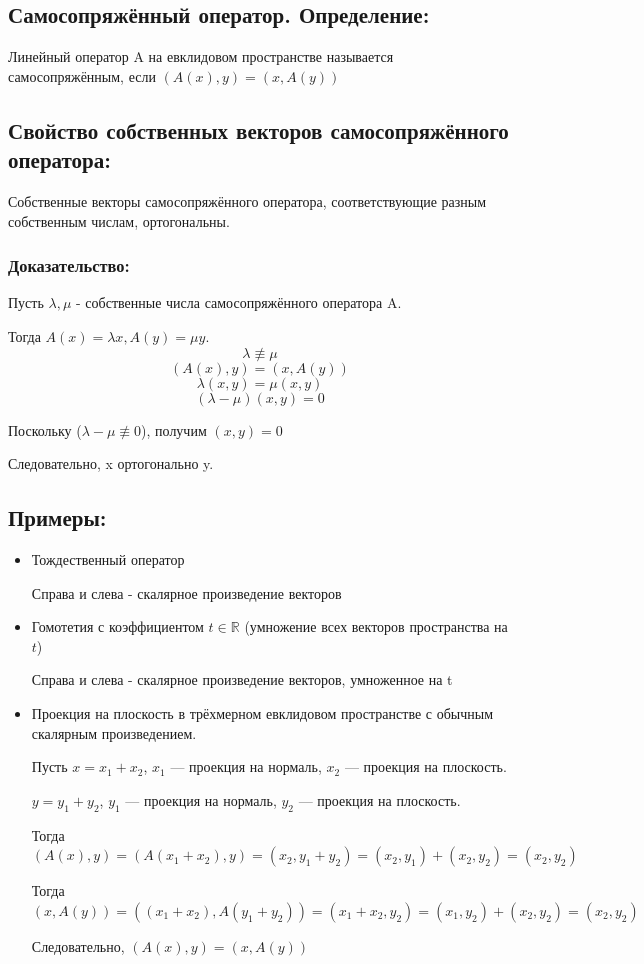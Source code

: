 \documentclass[12pt]{article}
\begin{document}
\subsection{Самосопряжённый оператор. Определение:}
Линейный оператор A на евклидовом пространстве называется самосопряжённым, если $(A(x), y) = (x, A(y))$

\subsection{Свойство собственных векторов самосопряжённого оператора:}
Собственные векторы самосопряжённого оператора, соответствующие разным собственным числам, ортогональны.

\subsubsection{Доказательство:}

Пусть $\lambda, \mu$ - собственные числа самосопряжённого оператора A.

Тогда $A(x) = \lambda x, A(y) = \mu y$.
\[
    \lambda \not \equiv \mu
\]
\[
    (A(x), y) = (x, A(y))
\]
\[
    \lambda (x, y) = \mu (x, y)
\]
\[
    (\lambda - \mu)(x, y) = 0
\]

Поскольку ($\lambda - \mu \not\equiv 0$), получим $(x, y) = 0$

Следовательно, x ортогонально y.

\subsection{Примеры:}
\begin{itemize}
    \item Тождественный оператор

          \quad Справа и слева - скалярное произведение векторов
    \item Гомотетия с коэффициентом $t \in \mathbb{R}$ (умножение всех векторов пространства на $t$)

          \quad Справа и слева - скалярное произведение векторов, умноженное на t
    \item Проекция на плоскость в трёхмерном евклидовом пространстве с обычным скалярным произведением.

          \quad Пусть $x = x_1 + x_2$, $x_1$ --- проекция на нормаль, $x_2$ --- проекция на плоскость.

          \quad $y = y_1 + y_2$, $y_1$ --- проекция на нормаль, $y_2$ --- проекция на плоскость.

          \quad Тогда $(A(x), y) = (A(x_1 + x_2), y) = (x_2, y_1 + y_2) = (x_2, y_1) + (x_2, y_2) = (x_2, y_2)$

          \quad Тогда $(x, A(y)) = ((x_1 + x_2), A(y_1 + y_2)) = (x_1 + x_2, y_2) = (x_1, y_2) + (x_2, y_2) = (x_2, y_2)$

          \quad Следовательно, $(A(x), y) = (x, A(y))$
\end{itemize}
\end{document}
